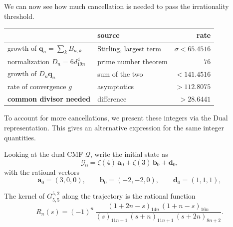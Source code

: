 \documentclass[oneside,english,11pt]{amsart}
\begin{document}
We can now see how much cancellation is needed to pass the irrationality threshold.
\begin{table}[H]
\centering
\renewcommand{\arraystretch}{1.25}
\small
\begin{tabular}{llr}
\toprule
& source & rate\\
\midrule
growth of $\mathbf q_n=\sum_kB_{n,k}$ & Stirling, largest term & $\sigma<65.4516$\\
normalization $D_n=6d_{19n}^4$ & prime number theorem & $76$\\
\midrule
growth of $D_n\mathbf q_n$ & sum of the two & $<141.4516$\\
rate of convergence $g$ &  asymptotics & $>112.8075$\\
\midrule
\textbf{common divisor needed} & difference & $\boldsymbol{>28.6441}$\\
\bottomrule
\end{tabular}
\end{table}
To account for more cancellations, we present these integers via the Dual representation. This gives an alternative expression for the same integer quantities.

Looking at the dual CMF $\mathcal{Q}$, write the initial state as
\[\mathcal G_0=\zeta(4)\,\mathbf a_0+\zeta(3)\,\mathbf b_0+\mathbf d_0,\] with the rational vectors
\[
  \mathbf a_0=(3,0,0),\qquad \mathbf b_0=(-2,-2,0),\qquad \mathbf d_0=(1,1,1),
\]

The kernel of $G^{5,2}_{5,5}$ along the trajectory is the rational function
\[
  R_n(s)=(-1)^n\,\frac{(1+2n-s)_{14n}\,(1+n-s)_{16n}}
  {(s)_{11n+1}\,(s+n)_{11n+1}\,(s+2n)_{8n+2}} .
\]
%
\end{document}
